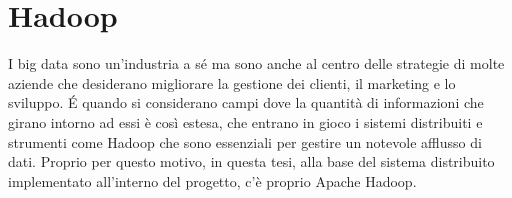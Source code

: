 \section{Hadoop}
I big data sono un'industria a sé ma sono anche al centro delle strategie di molte aziende che desiderano migliorare la gestione dei clienti, il marketing e lo sviluppo. É quando si considerano campi dove la quantità di informazioni che girano intorno ad essi è così estesa, che entrano in gioco i sistemi distribuiti e strumenti come Hadoop che sono essenziali per gestire un notevole afflusso di dati. Proprio per questo motivo, in questa tesi, alla base del sistema distribuito implementato all'interno del progetto, c'è proprio Apache Hadoop. 




% 